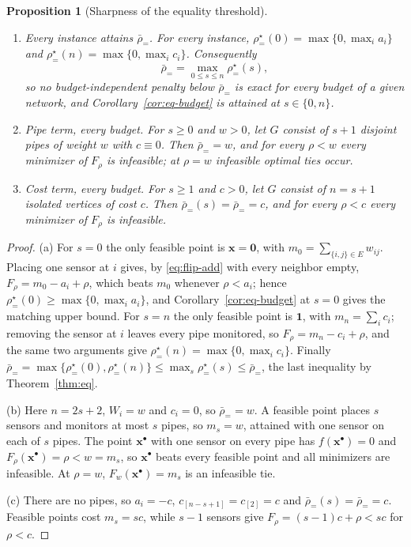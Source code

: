 \documentclass[11pt]{article}
\newtheorem{proposition}[theorem]{Proposition}
\newcommand{\ones}{\mathbf{1}}
\newcommand{\x}{\mathbf{x}}
\newcommand{\rbeq}{\bar\rho_{=}}
\newcommand{\rseq}{\rho^\star_{=}}
\begin{document}
\begin{proposition}[Sharpness of the equality threshold]
\label{prop:eq-sharp}
\leavevmode
\begin{enumerate}
\item[(a)] \emph{Every instance attains $\rbeq$.} For every instance,
$\rseq(0)=\max\{0,\max_ia_i\}$ and $\rseq(n)=\max\{0,\max_ic_i\}$. Consequently
\[
\rbeq=\max_{0\le s\le n}\rseq(s),
\]
so no budget-independent penalty below $\rbeq$ is exact for every budget of a given
network, and Corollary~\ref{cor:eq-budget} is attained at $s\in\{0,n\}$.
\item[(b)] \emph{Pipe term, every budget.} For $s\ge0$ and $w>0$, let $G$ consist
of $s+1$ disjoint pipes of weight $w$ with $c\equiv0$. Then $\rbeq=w$, and for
every $\rho<w$ every minimizer of $F_\rho$ is infeasible; at $\rho=w$ infeasible
optimal ties occur.
\item[(c)] \emph{Cost term, every budget.} For $s\ge1$ and $c>0$, let $G$ consist
of $n=s+1$ isolated vertices of cost $c$. Then $\rbeq(s)=\rbeq=c$, and for every
$\rho<c$ every minimizer of $F_\rho$ is infeasible.
\end{enumerate}
\end{proposition}

\begin{proof}
(a) For $s=0$ the only feasible point is $\x=\mathbf 0$, with
$m_0=\sum_{\{i,j\}\in E}w_{ij}$. Placing one sensor at $i$ gives, by
\eqref{eq:flip-add} with every neighbor empty, $F_\rho=m_0-a_i+\rho$, which beats
$m_0$ whenever $\rho<a_i$; hence $\rseq(0)\ge\max\{0,\max_ia_i\}$, and
Corollary~\ref{cor:eq-budget} at $s=0$ gives the matching upper bound. For $s=n$
the only feasible point is $\ones$, with $m_n=\sum_ic_i$; removing the sensor at
$i$ leaves every pipe monitored, so $F_\rho=m_n-c_i+\rho$, and the same two
arguments give $\rseq(n)=\max\{0,\max_ic_i\}$. Finally
$\rbeq=\max\{\rseq(0),\rseq(n)\}\le\max_s\rseq(s)\le\rbeq$, the last inequality by
Theorem~\ref{thm:eq}.

(b) Here $n=2s+2$, $W_i=w$ and $c_i=0$, so $\rbeq=w$. A feasible point places $s$
sensors and monitors at most $s$ pipes, so $m_s=w$, attained with one sensor on
each of $s$ pipes. The point $\x^\bullet$ with one sensor on every pipe has
$f(\x^\bullet)=0$ and $F_\rho(\x^\bullet)=\rho<w=m_s$, so $\x^\bullet$ beats every
feasible point and all minimizers are infeasible. At $\rho=w$,
$F_w(\x^\bullet)=m_s$ is an infeasible tie.

(c) There are no pipes, so $a_i=-c$, $c_{[n-s+1]}=c_{[2]}=c$ and
$\rbeq(s)=\rbeq=c$. Feasible points cost $m_s=sc$, while $s-1$ sensors give
$F_\rho=(s-1)c+\rho<sc$ for $\rho<c$.
\end{proof}
\end{document}
